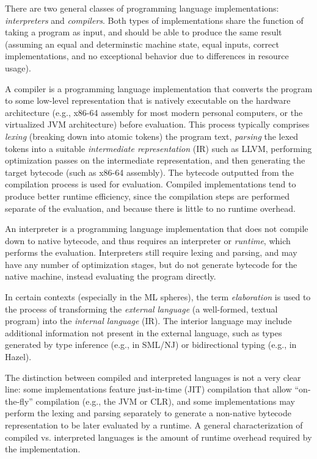 
There are two general classes of programming language implementations: \textit{interpreters} and \textit{compilers}. Both types of implementations share the function of taking a program as input, and should be able to produce the same result (assuming an equal and determinstic machine state, equal inputs, correct implementations, and no exceptional behavior due to differences in resource usage).

A compiler is a programming language implementation that converts the program to some low-level representation that is natively executable on the hardware architecture (e.g., x86-64 assembly for most modern personal computers, or the virtualized JVM architecture) before evaluation. This process typically comprises \textit{lexing} (breaking down into atomic tokens) the program text, \textit{parsing} the lexed tokens into a suitable \textit{intermediate representation} (IR) such as LLVM, performing optimization passes on the intermediate representation, and then generating the target bytecode (such as x86-64 assembly). The bytecode outputted from the compilation process is used for evaluation. Compiled implementations tend to produce better runtime efficiency, since the compilation steps are performed separate of the evaluation, and because there is little to no runtime overhead.

An interpreter is a programming language implementation that does not compile down to native bytecode, and thus requires an interpreter or \textit{runtime}, which performs the evaluation. Interpreters still require lexing and parsing, and may have any number of optimization stages, but do not generate bytecode for the native machine, instead evaluating the program directly.


In certain contexts (especially in the ML spheres), the term \textit{elaboration} is used to the process of transforming the \textit{external language} (a well-formed, textual program) into the \textit{internal language} (IR). The interior language may include additional information not present in the external language, such as types generated by type inference (e.g., in SML/NJ) or bidirectional typing (e.g., in Hazel).

The distinction between compiled and interpreted languages is not a very clear line: some implementations feature just-in-time (JIT) compilation that allow ``on-the-fly'' compilation (e.g., the JVM or CLR), and some implementations may perform the lexing and parsing separately to generate a non-native bytecode representation to be later evaluated by a runtime. A general characterization of compiled vs. interpreted languages is the amount of runtime overhead required by the implementation.

